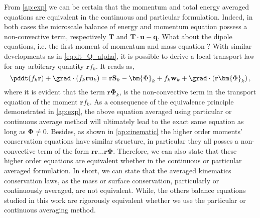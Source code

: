 From \ref{ap:exp} we can be certain that the momentum and total energy averaged equations are equivalent in the continuous and particular formulation.
Indeed, in both cases the microscale balance of energy and momentum equation possess a non-convective term, respectively $\textbf{T}$ and $\textbf{T}\cdot\textbf{u}-\textbf{q}$.
What about the dipole equations, i.e. the first moment of momentum and mass equation ?
With similar developments as in \ref{eq:dt_Q_alpha}, it is possible to derive a local transport law for any arbitrary quantity $\textbf{r}f_k$.
It reads as,
\begin{equation*}
    \pddt (f_k \textbf{r})
    + \grad \cdot \left(
        f_k \textbf{r} \textbf{u}_k
    \right)
    = \textbf{r} \textbf{S}_k 
    - \bm{\Phi}_k
    + f_k \textbf{w}_k
    + \grad \cdot \left(
        \textbf{r}\bm{\Phi}_k
    \right),
\end{equation*}
where it is evident that the term $\textbf{r} \bm{\Phi}_k$, is the non-convective term in the transport equation of the moment $\textbf{r}f_k$.
As a consequence of the equivalence principle demonstrated in \ref{ap:exp}, the above equation averaged using particular or continuous average method will ultimately lead to the exact same equation as long as $\bm{\Phi}\neq 0$. 
Besides, as shown in \ref{ap:cinematic} the higher order moments' conservation equations have similar structure, in particular they all posses a non-convective term of the form $\textbf{rr}\ldots\textbf{r}\mathbf{\Phi}$.
Therefore, we can also state that these higher order equations are equivalent whether in the continuous or particular averaged formulation.
In short, we can state that the averaged kinematics   conservation laws, as the mass or surface conservation, particularly or continuously averaged, are not equivalent. 
While, the others balance equations studied in this work are rigorously equivalent whether we use the particular or continuous averaging method.   

